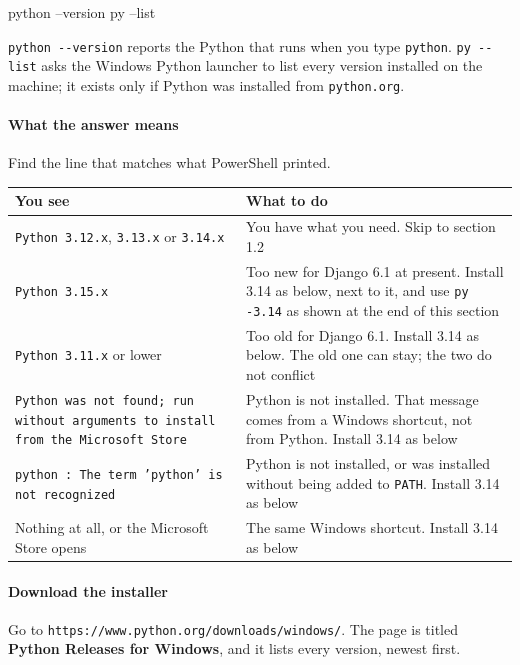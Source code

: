 \documentclass{article}
\newcommand{\cd}[1]{\texttt{#1}}
\newcommand{\cdb}[1]{\nolinkurl{#1}}
\begin{document}
\begin{code}
python --version
py --list
\end{code}

\cd{python -{}-version} reports the Python that runs when you type
\cd{python}. \cd{py -{}-list} asks the Windows Python launcher to list
every version installed on the machine; it exists only if Python was
installed from \cd{python.org}.

\paragraph{What the answer means}
Find the line that matches what PowerShell printed.

\vspace{.4em}
\begin{tabularx}{\textwidth}{@{}L{5.6cm} X@{}}
\toprule
\textbf{You see} & \textbf{What to do} \\
\midrule
\cd{Python 3.12.x}, \cd{3.13.x} or \cd{3.14.x} &
  You have what you need. Skip to section 1.2 \\
\cd{Python 3.15.x} &
  Too new for Django 6.1 at present. Install 3.14 as below, next to it,
  and use \cd{py -3.14} as shown at the end of this section \\
\cd{Python 3.11.x} or lower &
  Too old for Django 6.1. Install 3.14 as below. The old one can stay;
  the two do not conflict \\
\cd{Python was not found; run without arguments to install from the
  Microsoft Store} &
  Python is not installed. That message comes from a Windows shortcut,
  not from Python. Install 3.14 as below \\
\cd{python : The term 'python' is not recognized} &
  Python is not installed, or was installed without being added to
  \cd{PATH}. Install 3.14 as below \\
Nothing at all, or the Microsoft Store opens &
  The same Windows shortcut. Install 3.14 as below \\
\bottomrule
\end{tabularx}

\paragraph{Download the installer}

Go to \cdb{https://www.python.org/downloads/windows/}. The page is titled
\textbf{Python Releases for Windows}, and it lists every version, newest
first.
\end{document}
